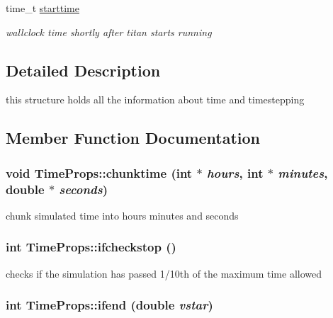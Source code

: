 \begin{CompactItemize}
time\_\-t \hyperlink{structTimeProps_o14}{starttime}
\begin{CompactList}\small\item\em wallclock time shortly after titan starts running \item\end{CompactList}\end{CompactItemize}


\subsection{Detailed Description}
this structure holds all the information about time and timestepping 



\subsection{Member Function Documentation}
\hypertarget{structTimeProps_a8}{
\subsubsection[chunktime]{\setlength{\rightskip}{0pt plus 5cm}void Time\-Props::chunktime (int $\ast$ {\em hours}, int $\ast$ {\em minutes}, double $\ast$ {\em seconds})}}
\label{structTimeProps_a8}


chunk simulated time into hours minutes and seconds 

\hypertarget{structTimeProps_a5}{
\subsubsection[ifcheckstop]{\setlength{\rightskip}{0pt plus 5cm}int Time\-Props::ifcheckstop ()}}
\label{structTimeProps_a5}


checks if the simulation has passed 1/10th of the maximum time allowed 

\hypertarget{structTimeProps_a4}{
\subsubsection[ifend]{\setlength{\rightskip}{0pt plus 5cm}int Time\-Props::ifend (double {\em vstar})}}
\label{structTimeProps_a4}


